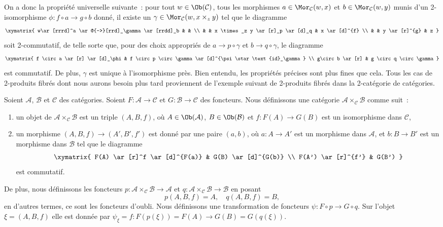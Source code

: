\noindent
On a donc la propriété universelle suivante : pour tout $w\in \Ob(\mathcal{C})$, tous les morphismes $a \in \Mor_{\mathcal C}(w, x)$ et $b \in \Mor_\mathcal{C}(w, y)$ munis d'un 2-isomorphisme $\phi : f \circ a \to g\circ b$
donné, il existe un $\gamma \in \Mor_{\mathcal C}(w, x \times_z y)$ tel que le
diagramme
$$
\xymatrix{
w\ar[rrrd]^a \ar@{-->}[rrd]_\gamma \ar[rrdd]_b & & \\
& & x \times_z y \ar[r]_p \ar[d]_q & x \ar[d]^{f} \\
& & y \ar[r]^{g} & z }
$$
soit 2-commutatif, de telle sorte que, pour des choix appropriés de $a \to p \circ \gamma$ et $b \to q \circ \gamma$, le diagramme
$$
\xymatrix{
f \circ a \ar[r] \ar[d]_\phi &
f \circ p \circ \gamma
\ar[d]^{\psi \star \text{id}_\gamma}
\\
g\circ b
\ar[r]
&
g \circ q \circ \gamma
}
$$
est commutatif. De plus, $\gamma$ est unique à
l'isomorphisme près. Bien entendu, les propriétés précises sont plus fines que
cela. Tous les cas de 2-produits fibrés dont nous aurons besoin plus tard
proviennent de l'exemple suivant de 2-produits fibrés dans la 2-catégorie de
catégories.

\begin{example}
\label{example-2-fibre-product-categories}
Soient $\mathcal{A}$, $\mathcal{B}$ et $\mathcal{C}$ des catégories. Soient $F : \mathcal{A} \to \mathcal{C}$ et $G : \mathcal{B} \to \mathcal{C}$ des
foncteurs. Nous définissons une catégorie $\mathcal{A} \times_\mathcal{C} \mathcal{B}$ comme suit :
\begin{enumerate}
\item un objet de $\mathcal{A} \times_\mathcal{C} \mathcal{B}$ est un triple
$(A, B, f)$, où $A\in \Ob(\mathcal{A})$, $B\in \Ob(\mathcal{B})$ et $f : F(A) \to G(B)$ est un isomorphisme dans $\mathcal{C}$,
\item un morphisme $(A, B, f) \to (A', B', f')$ est donné par une paire $(a, b)$, où $a : A \to A'$ est un morphisme dans $\mathcal{A}$, et $b : B \to B'$
est un morphisme dans $\mathcal{B}$ tel que le diagramme
$$
\xymatrix{
F(A) \ar[r]^f \ar[d]^{F(a)} & G(B) \ar[d]^{G(b)} \\
F(A') \ar[r]^{f'} & G(B')
}
$$
est commutatif.
\end{enumerate}
De plus, nous définissons les foncteurs $p : \mathcal{A} \times_\mathcal{C}\mathcal{B} \to \mathcal{A}$ et $q : \mathcal{A} \times_\mathcal{C}\mathcal{B} \to \mathcal{B}$ en posant
$$
p(A, B, f) = A, \quad q(A, B, f) = B,
$$
en d'autres termes, ce sont les foncteurs d'oubli. Nous définissons une
transformation de foncteurs $\psi : F \circ p \to G \circ q$. Sur l'objet $\xi = (A, B, f)$ elle est donnée par $\psi_\xi = f : F(p(\xi)) = F(A) \to G(B) = G(q(\xi))$.
\end{example}

